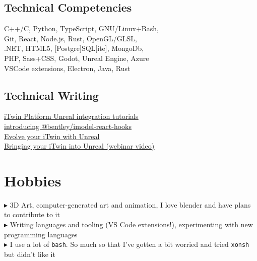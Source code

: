 \documentclass[Letterpaper,11pt]{article}
\newcommand\bul{$\blacktriangleright$ }
\newcommand\link[2]{\href{#1}{\underline{#2}}}
\begin{document}
\begin{multicols}{2}

    \subsection*{Technical Competencies}
        C++/C, Python, TypeScript, GNU/Linux+Bash,
        \\
        Git, React, Node.js, Rust, OpenGL/GLSL,
        \\
        .NET, HTML5, [Postgre]SQL[ite], MongoDb,
        \\ 
        PHP, Sass+CSS, Godot, Unreal Engine, Azure
        \\
        VSCode extensions, Electron, Java, Rust

    \subsection*{Technical Writing}
        \link{https://developer.bentley.com/tutorials/itwin-unreal-controlling-your-imodel/}{iTwin Platform Unreal integration tutorials}
        \\
        \link{https://medium.com/itwinjs/introducing-bentley-imodel-react-hooks-8945a72711d2}{introducing @bentley/imodel-react-hooks}
        \\
        \link{https://medium.com/itwinjs/evolve-your-itwin-with-unreal-45206afe19f4}{Evolve your iTwin with Unreal}
        \\
        \link{https://event.on24.com/wcc/r/3758735/E87578AC3042C366C712CAFCB98A21E4?partnerref=SocialMedia}{Bringing your iTwin into Unreal (webinar video)}

\end{multicols}

\section*{Hobbies}

    \bul 3D Art, computer-generated art and animation, I love blender and have plans to contribute to it
    \\
    \bul Writing languages and tooling (VS Code extensions!), experimenting with new programming languages
    \\
    \bul I use a lot of \texttt{bash}. So much so that I've gotten a bit worried and tried \texttt{xonsh} but didn't like it

\clearpage
\end{document}
